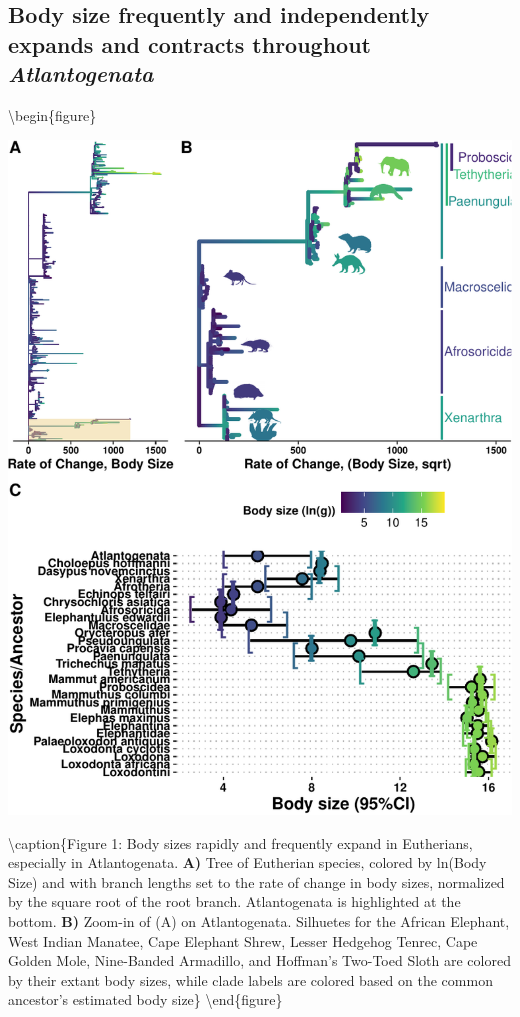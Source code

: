 \documentclass[10pt,letterpaper]{article}
\begin{document}
\hypertarget{body-size-frequently-and-independently-expands-and-contracts-throughout-atlantogenata}{%
\subsection{\texorpdfstring{Body size frequently and independently
expands and contracts throughout
\emph{Atlantogenata}}{Body size frequently and independently expands and contracts throughout Atlantogenata}}\label{body-size-frequently-and-independently-expands-and-contracts-throughout-atlantogenata}}

\textbackslash{}begin\{figure\}

\includegraphics{paper_PLOS_draft_files/figure-latex/Figure 1-1}
\hfill{}

\textbackslash{}caption\{Figure 1: Body sizes rapidly and frequently
expand in Eutherians, especially in Atlantogenata. \textbf{A)} Tree of
Eutherian species, colored by ln(Body Size) and with branch lengths set
to the rate of change in body sizes, normalized by the square root of
the root branch. Atlantogenata is highlighted at the bottom. \textbf{B)}
Zoom-in of (A) on Atlantogenata. Silhuetes for the African Elephant,
West Indian Manatee, Cape Elephant Shrew, Lesser Hedgehog Tenrec, Cape
Golden Mole, Nine-Banded Armadillo, and Hoffman's Two-Toed Sloth are
colored by their extant body sizes, while clade labels are colored based
on the common ancestor's estimated body size\}\label{fig:Figure 1}
\textbackslash{}end\{figure\}
\end{document}
